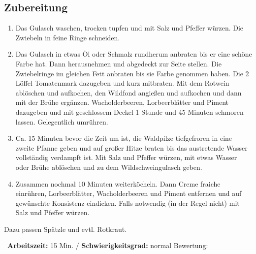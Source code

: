 \begin{minipage}[t]{0.58\textwidth}
\vspace{0pt}
\subsection*{Zubereitung}
\begin{enumerate}[leftmargin=*, itemindent=14pt]
\item Das Gulasch waschen, trocken tupfen und mit Salz und Pfeffer würzen. Die Zwiebeln in feine Ringe schneiden.

\item Das Gulasch in etwas Öl oder Schmalz rundherum anbraten bis er eine schöne Farbe hat. Dann herausnehmen und abgedeckt zur Seite stellen. Die Zwiebelringe im gleichen Fett anbraten bis sie Farbe genommen haben. Die 2 Löffel Tomatenmark dazugeben und kurz mitbraten. Mit dem Rotwein ablöschen und aufkochen, den Wildfond angießen und aufkochen und dann mit der Brühe ergänzen. Wacholderbeeren, Lorbeerblätter und Piment dazugeben und mit geschlossem Deckel 1 Stunde und 45 Minuten schmoren lassen. Gelegentlich umrühren.

\item Ca. 15 Minuten bevor die Zeit um ist, die Waldpilze tiefgefroren in eine zweite Pfanne geben und auf großer Hitze braten bis das austretende Wasser vollständig verdampft ist. Mit Salz und Pfeffer würzen, mit etwas Wasser oder Brühe ablöschen und zu dem Wildschweingulasch geben.

\item Zusammen nochmal 10 Minuten weiterköcheln. Dann Creme fraiche einrühren, Lorbeerblätter, Wacholderbeeren und Piment entfernen und auf gewünschte Konsistenz eindicken. Falls notwendig (in der Regel nicht) mit Salz und Pfeffer würzen.
\end{enumerate}
Dazu passen Spätzle und evtl. Rotkraut.
\end{minipage}
\vfill
\decothreeright \, \textbf{Arbeitszeit:} 15 Min. / \textbf{Schwierigkeitsgrad:} normal \decothreeleft \hfill Bewertung:  \CIRCLE \CIRCLE \CIRCLE \CIRCLE \CIRCLE